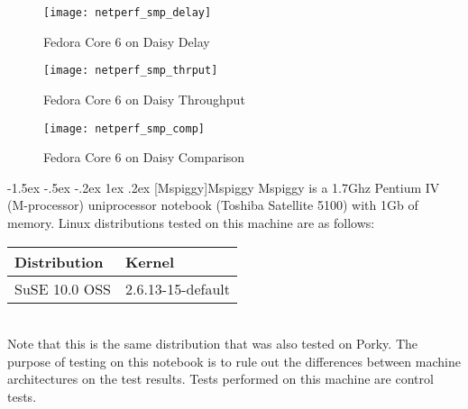 \documentclass[letterpaper,final,notitlepage,twocolumn,10pt,twoside]{article}
\makeatletter
\renewcommand\subsection{\@startsection{subsection}{2}{\z@}%
                                     {-1.5ex \@plus -.5ex \@minus -.2ex}%
                                     {1ex \@plus .2ex}%
                                     {\normalfont\normalsize\bfseries}}
\makeatother
\begin{document}
\begin{figure}[p]
\center\texttt{[image: netperf\_smp\_delay]}
\caption[Fedora Core 6 on Daisy Delay]{Fedora Core 6 on Daisy Delay}
\label{figure:smpdly}
\end{figure}

\begin{figure}[p]
\center\texttt{[image: netperf\_smp\_thrput]}
\caption[Fedora Core 6 on Daisy Throughput]{Fedora Core 6 on Daisy Throughput}
\label{figure:smpthrput}
\end{figure}

\begin{figure}[p]
\center\texttt{[image: netperf\_smp\_comp]}
\caption[Fedora Core 6 on Daisy Comparison]{Fedora Core 6 on Daisy Comparison}
\label{figure:smpcomp}
\end{figure}

\subsection[Mspiggy]{Mspiggy}
Mspiggy is a 1.7Ghz Pentium IV (M-processor) uniprocessor notebook (Toshiba
Satellite 5100) with 1Gb of memory.  Linux distributions tested on this
machine are as follows:

\begin{tabular}{ll}\\
Distribution & Kernel\\
\hline
SuSE 10.0 OSS & 2.6.13-15-default\\
\end{tabular}\\[1.0ex]

Note that this is the same distribution that was also tested on Porky.  The
purpose of testing on this notebook is to rule out the differences between
machine architectures on the test results.  Tests performed on this machine
are control tests.
\end{document}
